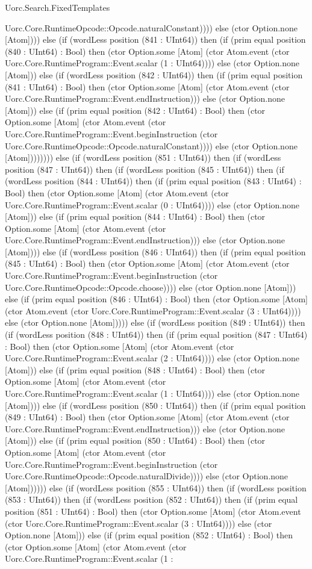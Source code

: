\begin{lexlean}{Uorc.Search.FixedTemplates}
\begin{semanticmodule}
{Uorc.Core.RuntimeOpcode::Opcode.naturalConstant)))) else (ctor Option.none [Atom]))) else (if (wordLess position (841 : UInt64)) then (if (prim equal position (840 : UInt64) : Bool) then (ctor Option.some [Atom] (ctor Atom.event (ctor Uorc.Core.RuntimeProgram::Event.scalar (1 : UInt64)))) else (ctor Option.none [Atom])) else (if (wordLess position (842 : UInt64)) then (if (prim equal position (841 : UInt64) : Bool) then (ctor Option.some [Atom] (ctor Atom.event (ctor Uorc.Core.RuntimeProgram::Event.endInstruction))) else (ctor Option.none [Atom])) else (if (prim equal position (842 : UInt64) : Bool) then (ctor Option.some [Atom] (ctor Atom.event (ctor Uorc.Core.RuntimeProgram::Event.beginInstruction (ctor Uorc.Core.RuntimeOpcode::Opcode.naturalConstant)))) else (ctor Option.none [Atom]))))))) else (if (wordLess position (851 : UInt64)) then (if (wordLess position (847 : UInt64)) then (if (wordLess position (845 : UInt64)) then (if (wordLess position (844 : UInt64)) then (if (prim equal position (843 : UInt64) : Bool) then (ctor Option.some [Atom] (ctor Atom.event (ctor Uorc.Core.RuntimeProgram::Event.scalar (0 : UInt64)))) else (ctor Option.none [Atom])) else (if (prim equal position (844 : UInt64) : Bool) then (ctor Option.some [Atom] (ctor Atom.event (ctor Uorc.Core.RuntimeProgram::Event.endInstruction))) else (ctor Option.none [Atom]))) else (if (wordLess position (846 : UInt64)) then (if (prim equal position (845 : UInt64) : Bool) then (ctor Option.some [Atom] (ctor Atom.event (ctor Uorc.Core.RuntimeProgram::Event.beginInstruction (ctor Uorc.Core.RuntimeOpcode::Opcode.choose)))) else (ctor Option.none [Atom])) else (if (prim equal position (846 : UInt64) : Bool) then (ctor Option.some [Atom] (ctor Atom.event (ctor Uorc.Core.RuntimeProgram::Event.scalar (3 : UInt64)))) else (ctor Option.none [Atom])))) else (if (wordLess position (849 : UInt64)) then (if (wordLess position (848 : UInt64)) then (if (prim equal position (847 : UInt64) : Bool) then (ctor Option.some [Atom] (ctor Atom.event (ctor Uorc.Core.RuntimeProgram::Event.scalar (2 : UInt64)))) else (ctor Option.none [Atom])) else (if (prim equal position (848 : UInt64) : Bool) then (ctor Option.some [Atom] (ctor Atom.event (ctor Uorc.Core.RuntimeProgram::Event.scalar (1 : UInt64)))) else (ctor Option.none [Atom]))) else (if (wordLess position (850 : UInt64)) then (if (prim equal position (849 : UInt64) : Bool) then (ctor Option.some [Atom] (ctor Atom.event (ctor Uorc.Core.RuntimeProgram::Event.endInstruction))) else (ctor Option.none [Atom])) else (if (prim equal position (850 : UInt64) : Bool) then (ctor Option.some [Atom] (ctor Atom.event (ctor Uorc.Core.RuntimeProgram::Event.beginInstruction (ctor Uorc.Core.RuntimeOpcode::Opcode.naturalDivide)))) else (ctor Option.none [Atom]))))) else (if (wordLess position (855 : UInt64)) then (if (wordLess position (853 : UInt64)) then (if (wordLess position (852 : UInt64)) then (if (prim equal position (851 : UInt64) : Bool) then (ctor Option.some [Atom] (ctor Atom.event (ctor Uorc.Core.RuntimeProgram::Event.scalar (3 : UInt64)))) else (ctor Option.none [Atom])) else (if (prim equal position (852 : UInt64) : Bool) then (ctor Option.some [Atom] (ctor Atom.event (ctor Uorc.Core.RuntimeProgram::Event.scalar (1 : }
\end{semanticmodule}
\end{lexlean}
